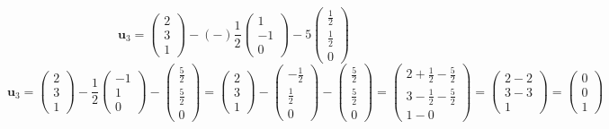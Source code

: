 \documentclass[a3paper,12pt]{extarticle} %
\begin{document}
\begin{enumerate}
\begin{enumerate}
\[        \]
        \[
            \mathbf{u}_3 = \begin{pmatrix} 2 \\ 3 \\ 1 \end{pmatrix} - (-) \frac{1}{2} \begin{pmatrix} 1 \\ -1 \\ 0 \end{pmatrix} - 5 \begin{pmatrix} \frac{1}{2} \\ \frac{1}{2} \\ 0 \end{pmatrix}
        \]
        \[
            \mathbf{u}_3 = \begin{pmatrix} 2 \\ 3 \\ 1 \end{pmatrix} - \frac{1}{2} \begin{pmatrix} -1 \\ 1 \\ 0 \end{pmatrix} - \begin{pmatrix} \frac{5}{2} \\ \frac{5}{2} \\ 0 \end{pmatrix} = \begin{pmatrix} 2 \\ 3 \\ 1 \end{pmatrix} - \begin{pmatrix} -\frac{1}{2} \\ \frac{1}{2} \\ 0 \end{pmatrix} - \begin{pmatrix} \frac{5}{2} \\ \frac{5}{2} \\ 0 \end{pmatrix} = \begin{pmatrix} 2 + \frac{1}{2} - \frac{5}{2} \\ 3 - \frac{1}{2} - \frac{5}{2} \\ 1 - 0 \end{pmatrix} = \begin{pmatrix} 2 - 2 \\ 3 - 3 \\ 1 \end{pmatrix} = \begin{pmatrix} 0 \\ 0 \\ 1 \end{pmatrix}
\]
\end{enumerate}
\end{enumerate}
\end{document}
